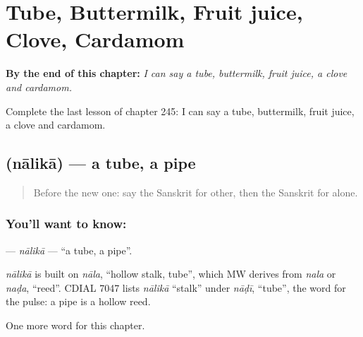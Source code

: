 
\chapter{Tube, Buttermilk, Fruit juice, Clove, Cardamom}
\label{ch:sa-tube-buttermilk-fruit-juice-clove-cardamom}

\begin{chapteropening}
\textbf{By the end of this chapter:} \emph{I can say a tube, buttermilk, fruit juice, a clove and cardamom.}

Complete the last lesson of chapter 245: I can say a tube, buttermilk, fruit juice, a clove and cardamom.
\end{chapteropening}

\section[\texorpdfstring{\sk{नालिका} (nālikā)}{नालिका (nālikā)}]{ (nālikā) — a tube, a pipe}

\label{lesson:SA-C245-nalika}



\begin{quote}
Before the new one: say the Sanskrit for other, then the Sanskrit for alone.
\end{quote}

\subsection*{You'll want to know: }
\textbf{} — \emph{nālikā} — \textquotedblleft{}a tube, a pipe\textquotedblright{}.

\begin{cousinweb}
\emph{nālikā} is built on \emph{nāla}, \textquotedblleft{}hollow stalk, tube\textquotedblright{}, which MW derives from \emph{nala} or \emph{naḍa}, \textquotedblleft{}reed\textquotedblright{}. CDIAL 7047 lists \emph{nālikā} \textquotedblleft{}stalk\textquotedblright{} under \emph{nāḍī}, \textquotedblleft{}tube\textquotedblright{}, the word for the pulse: a pipe is a hollow reed.
\end{cousinweb}

\begin{grammarlens}[title={What you've built}]
One more word for this chapter.
\end{grammarlens}

